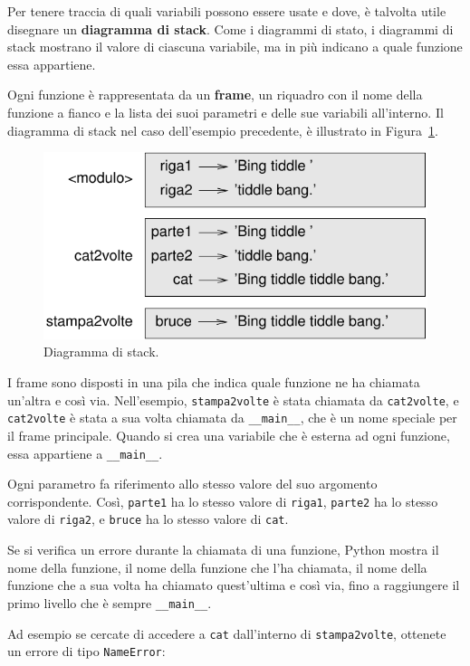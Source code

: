 \documentclass[10pt]{book}
\begin{document}
Per tenere traccia di quali variabili possono essere usate e dove, è talvolta utile disegnare un {\bf diagramma di stack}. Come i diagrammi di stato, i diagrammi di stack mostrano il valore di ciascuna variabile, ma in più indicano a quale funzione essa appartiene.


Ogni funzione è rappresentata da un {\bf frame}, un riquadro con il nome della funzione a fianco e la lista dei suoi parametri e delle sue variabili all'interno. Il diagramma di stack nel caso dell'esempio precedente, è illustrato in Figura~\ref{fig.stack}.

\begin{figure}
\centerline
{\includegraphics[scale=0.8]{figs/stack.pdf}}
\caption{Diagramma di stack.}
\label{fig.stack}
\end{figure}


I frame sono disposti in una pila che indica quale funzione ne ha chiamata un'altra e così via. Nell'esempio, \verb"stampa2volte" è stata chiamata da \verb"cat2volte", e \verb"cat2volte" è stata a sua volta chiamata da 
\verb"__main__", che è un nome speciale per il frame principale. Quando si crea una variabile che è esterna ad ogni funzione, essa appartiene a 
\verb"__main__".

Ogni parametro fa riferimento allo stesso valore del suo argomento corrispondente. Così, {\tt parte1} ha lo stesso valore di
{\tt riga1}, {\tt parte2} ha lo stesso valore di {\tt riga2},
e {\tt bruce} ha lo stesso valore di {\tt cat}.

Se si verifica un errore durante la chiamata di una funzione, Python mostra il nome della funzione, il nome della funzione che l'ha chiamata, il nome della funzione che a sua volta ha chiamato quest'ultima e così via, fino a raggiungere il primo livello che è sempre \verb"__main__".

Ad esempio se cercate di accedere a {\tt cat} dall'interno di
\verb"stampa2volte", ottenete un errore di tipo {\tt NameError}:
\end{document}
